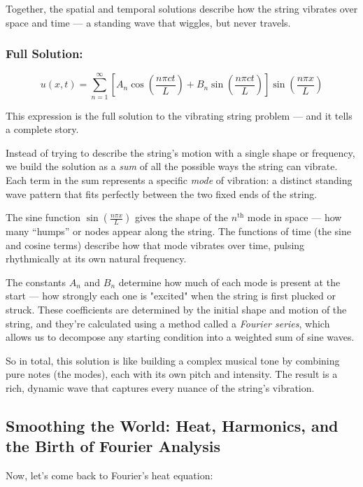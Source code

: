 Together, the spatial and temporal solutions describe how the string vibrates over space and time — a standing wave that wiggles, but never travels.


\subsubsection{Full Solution:}
\[
u(x,t) = \sum_{n=1}^{\infty} \left[ A_n \cos\left(\frac{n\pi c t}{L}\right) + B_n \sin\left(\frac{n\pi c t}{L}\right) \right] \sin\left(\frac{n\pi x}{L}\right)
\]

This expression is the full solution to the vibrating string problem — and it tells a complete story.

Instead of trying to describe the string’s motion with a single shape or frequency, we build the solution as a \textit{sum} of all the possible ways the string can vibrate. Each term in the sum represents a specific \textit{mode} of vibration: a distinct standing wave pattern that fits perfectly between the two fixed ends of the string.

The sine function \( \sin\left(\frac{n\pi x}{L}\right) \) gives the shape of the \( n^\text{th} \) mode in space — how many “humps” or nodes appear along the string. The functions of time (the sine and cosine terms) describe how that mode vibrates over time, pulsing rhythmically at its own natural frequency.

The constants \( A_n \) and \( B_n \) determine how much of each mode is present at the start — how strongly each one is "excited" when the string is first plucked or struck. These coefficients are determined by the initial shape and motion of the string, and they’re calculated using a method called a \textit{Fourier series}, which allows us to decompose any starting condition into a weighted sum of sine waves.

So in total, this solution is like building a complex musical tone by combining pure notes (the modes), each with its own pitch and intensity. The result is a rich, dynamic wave that captures every nuance of the string’s vibration.






\subsection{Smoothing the World: Heat, Harmonics, and the Birth of Fourier Analysis}

Now, let's come back to Fourier's heat equation:

